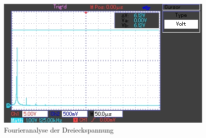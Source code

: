 	\begin{figure}[h]
		\begin{center}
		\includegraphics[scale=1.0]{picfad.jpg}
		\caption{Fourieranalyse der Dreieckspannung}
		\label{picfad}
		\end{center}	
	\end{figure}